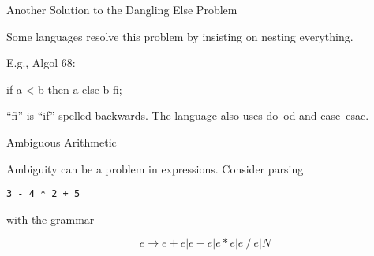 \documentclass{plt}
\def\plus#1#2{node {\texttt{+}} child {#1} child {#2}}
\def\minus#1#2{node {\texttt{-}} child {#1} child {#2}}
\def\mult#1#2{node {\texttt{*}} child {#1} child {#2}}
\def\lit#1{node {#1}}
\begin{document}
\begin{frame}[fragile]{Another Solution  to the Dangling Else Problem}

Some languages resolve this problem by insisting on nesting
everything.

E.g., Algol 68:

\begin{center}
\begin{algol}
if a < b then a else b fi;
\end{algol}
\end{center}

``fi'' is ``if'' spelled backwards.  The language also uses do--od and
case--esac.
\end{frame}

\begin{frame}{Ambiguous Arithmetic}

Ambiguity can be a problem in expressions.  Consider parsing

\begin{center}
\texttt{3 - 4 * 2 + 5}
\end{center}

with the grammar

\[e \rightarrow  e + e | e - e | e * e | e \mathop{/} e | N\]

\ttfamily

\hfil
{}
\hfil
{}
\hfil
{}


\end{frame}
\end{document}
